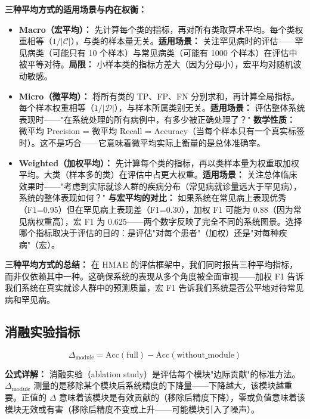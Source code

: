 \documentclass[11pt,a4paper]{ctexart}
\theoremstyle{remark}
\begin{document}
\textbf{三种平均方式的适用场景与内在权衡：}
\begin{itemize}[nosep]
\item \textbf{Macro（宏平均）：} 先计算每个类的指标，再对所有类取算术平均。每个类权重相等（$1/|\mathcal{C}|$），与类的样本量无关。\textbf{适用场景：} 关注罕见病时的评估——罕见病类（可能只有 10 个样本）与常见病类（可能有 1000 个样本）在评估中被平等对待。\textbf{局限：} 小样本类的指标方差大（因为分母小），宏平均对随机波动敏感。
\item \textbf{Micro（微平均）：} 将所有类的 TP、FP、FN 分别求和，再计算全局指标。每个样本权重相等（$1/|\mathcal{D}|$），与样本所属类别无关。\textbf{适用场景：} 评估整体系统表现时——"在系统处理的所有病例中，有多少被正确处理了？" \textbf{数学性质：} 微平均 Precision = 微平均 Recall = Accuracy（当每个样本只有一个真实标签时）。这不是巧合——它意味着微平均实际上衡量的是总体准确率。
\item \textbf{Weighted（加权平均）：} 先计算每个类的指标，再以类样本量为权重取加权平均。大类（样本多的类）在评估中占更大权重。\textbf{适用场景：} 关注总体临床效果时——"考虑到实际就诊人群的疾病分布（常见病就诊量远大于罕见病），系统的整体表现如何？" \textbf{与宏平均的对比：} 如果系统在常见病上表现优秀（F1=0.95）但在罕见病上表现差（F1=0.30），加权 F1 可能为 0.88（因为常见病权重高），宏 F1 为 0.625——两个数字反映了完全不同的系统图景。选择哪个指标取决于评估的目的：是评估"对每个患者"（加权）还是"对每种疾病"（宏）。
\end{itemize}

\textbf{三种平均方式的总结：} 在 HMAE 的评估框架中，我们同时报告三种平均指标，而非仅依赖其中一种。这确保系统的表现从多个角度被全面审视——加权 F1 告诉我们系统在真实就诊人群中的预测质量，宏 F1 告诉我们系统是否公平地对待常见病和罕见病。

\subsection{消融实验指标}

\begin{equation}
\Delta_{\text{module}} = \text{Acc}(\text{full}) - \text{Acc}(\text{without\_module})
\end{equation}

\textbf{公式详解：} 消融实验（ablation study）是评估每个模块"边际贡献"的标准方法。$\Delta_{\text{module}}$ 测量的是移除某个模块后系统精度的下降量——下降越大，该模块越重要。正值的 $\Delta$ 意味着该模块是有效贡献的（移除后精度下降），零或负值意味着该模块无效或有害（移除后精度不变或上升——可能模块引入了噪声）。
\end{document}
